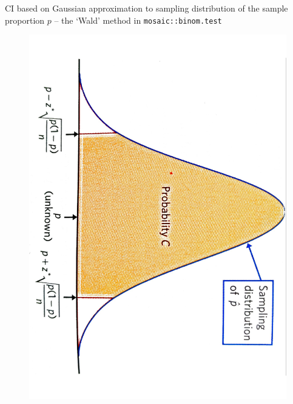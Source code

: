 \documentclass[10pt,handout]{beamer}\usepackage[]{graphicx}\usepackage[]{color}
\begin{document}
\begin{frame}{CI based on Gaussian approximation to sampling distribution of the sample proportion $p$ -- the `Wald' method in \texttt{mosaic::binom.test}}
	\begin{center}
	\begin{figure}
		\includegraphics[scale=0.3,angle=90]{prop1.pdf}
	\end{figure}
\end{center}
	
\end{frame}
\end{document}
